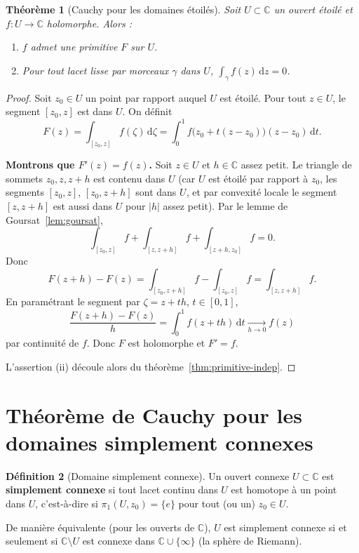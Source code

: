 \documentclass[12pt,a4paper,openany]{book}
\theoremstyle{definition}
\newtheorem{definition}{Définition}[chapter]
\theoremstyle{plain}
\newtheorem{theoreme}[definition]{Théorème}
\theoremstyle{remark}
\newcommand{\C}{\mathbb{C}}
\newcommand{\dd}{\mathrm{d}}
\newcommand{\abs}[1]{\left|#1\right|}
\begin{document}
\begin{theoreme}[Cauchy pour les domaines étoilés]\label{thm:cauchy-etoile}
Soit $U \subset \C$ un ouvert étoilé et $f \colon U \to \C$ holomorphe. Alors :
\begin{enumerate}[label=\textup{(\roman*)}]
  \item $f$ admet une primitive $F$ sur $U$.
  \item Pour tout lacet lisse par morceaux $\gamma$ dans $U$,
    $\displaystyle \int_\gamma f(z)\,\dd z = 0$.
\end{enumerate}
\end{theoreme}

\begin{proof}
Soit $z_0 \in U$ un point par rapport auquel $U$ est étoilé. Pour tout
$z \in U$, le segment $[z_0, z]$ est dans $U$. On définit
\[
  F(z) = \int_{[z_0, z]} f(\zeta)\,\dd\zeta
  = \int_0^1 f\bigl(z_0 + t(z-z_0)\bigr)(z-z_0)\,\dd t.
\]

\textbf{Montrons que $F'(z) = f(z)$.} Soit $z \in U$ et $h \in \C$ assez petit.
Le triangle de sommets $z_0, z, z+h$ est contenu dans $U$ (car $U$ est étoilé
par rapport à $z_0$, les segments $[z_0,z]$, $[z_0,z+h]$ sont dans $U$, et
par convexité locale le segment $[z,z+h]$ est aussi dans $U$ pour $\abs{h}$
assez petit). Par le lemme de Goursat~\ref{lem:goursat},
\[
  \int_{[z_0,z]} f + \int_{[z,z+h]} f + \int_{[z+h,z_0]} f = 0.
\]
Donc
\[
  F(z+h) - F(z) = \int_{[z_0,z+h]} f - \int_{[z_0,z]} f
  = \int_{[z,z+h]} f.
\]
En paramétrant le segment par $\zeta = z + th$, $t \in [0,1]$,
\[
  \frac{F(z+h)-F(z)}{h} = \int_0^1 f(z+th)\,\dd t \xrightarrow[h \to 0]{} f(z)
\]
par continuité de $f$. Donc $F$ est holomorphe et $F' = f$.

L'assertion (ii) découle alors du théorème~\ref{thm:primitive-indep}.
\end{proof}

\section{Théorème de Cauchy pour les domaines simplement connexes}\label{sec:cauchy-simplement-connexe}

\begin{definition}[Domaine simplement connexe]\label{def:simplement-connexe}
Un ouvert connexe $U \subset \C$ est \textbf{simplement connexe}%
 si tout lacet continu dans $U$ est homotope à un
point dans $U$, c'est-à-dire si $\pi_1(U, z_0) = \{e\}$ pour tout (ou un)
$z_0 \in U$.

De manière équivalente (pour les ouverts de $\C$), $U$ est simplement connexe
si et seulement si $\C \setminus U$ est connexe dans $\C \cup \{\infty\}$
(la sphère de Riemann).
\end{definition}
\end{document}
